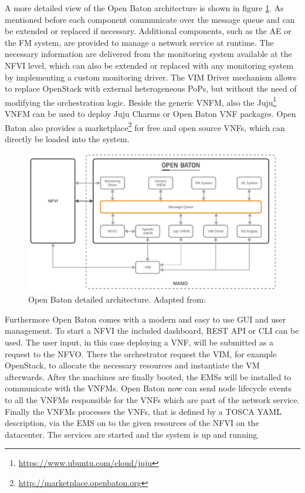 A more detailed view of the Open Baton architecture is shown in figure \ref{fig:open_baton_detailed_architecture}.
As mentioned before each component communicate over the message queue and can be extended or replaced if necessary.
Additional components, such as the \ac{AE} or the \ac{FM} system, are provided to manage a network service at runtime.\autocite{openBatonDoc}
The necessary information are delivered from the monitoring system available at the \ac{NFVI} level, which can also be extended or replaced with any monitoring system by implementing a custom monitoring driver.\autocite{openBatonDoc}
The \ac{VIM} Driver mechanism allows to replace OpenStack with external heterogeneous \acp{PoP}, but without the need of modifying the orchestration logic.\autocite{openBatonDoc}
Beside the generic \ac{VNFM}, also the Juju\footnote{\url{https://www.ubuntu.com/cloud/juju}} \ac{VNFM} can be used to deploy Juju Charms or Open Baton \ac{VNF} packages.
Open Baton also provides a marketplace\footnote{\url{http://marketplace.openbaton.org}} for free and open source \acp{VNF}, which can directly be loaded into the system.

\begin{figure}[H]
    \centering
    \includegraphics[width=\textwidth]{resources/images/open_baton_architecture.png}
    \caption[Open Baton detailed architecture]{Open Baton detailed architecture. Adapted from: \autocite{openBatonDoc}}
    \label{fig:open_baton_detailed_architecture}
\end{figure}

Furthermore Open Baton comes with a modern and easy to use \ac{GUI} and user management.
To start a \ac{NFVI} the included dashboard, \ac{REST} \ac{API} or \ac{CLI} can be used.
The user input, in this case deploying a \ac{VNF}, will be submitted as a request to the \ac{NFVO}.
There the orchestrator request the \ac{VIM}, for example OpenStack, to allocate the necessary resources and instantiate the \ac{VM} afterwards.
After the machines are finally booted, the \acp{EMS} will be installed to communicate with the \acp{VNFM}.
Open Baton now can send node lifecycle events to all the \acp{VNFM} responsible for the \acp{VNF} which are part of the network service.
Finally the \acp{VNFM} processes the \acp{VNF}, that is defined by a \ac{TOSCA} \ac{YAML} description, via the \ac{EMS} on to the given resources of the \ac{NFVI} on the datacenter.
The services are started and the system is up and running.


